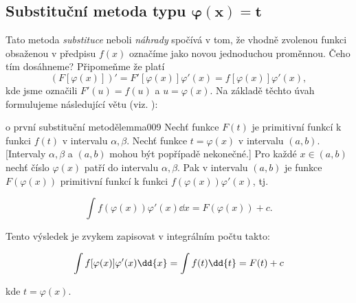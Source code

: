     \newpage
    \subsection[Substituční metoda typu \texorpdfstring{\(\varphi(x) = t\)}{\phi(x) = t}]
      {Substituční metoda typu \(\bm{\varphi(x) = t}\)}\label{mai:IchapVIIsecIIIssecIII} 
      
      Tato metoda \emph{substituce} neboli \emph{náhrady} spočívá v tom, že vhodně zvolenou funkci
      obsaženou v předpisu \(f(x)\) označíme jako novou jednoduchou proměnnou. Čeho tím dosáhneme?
      Připomeňme že platí\[\left(F[\varphi(x)]\right)'=F'[\varphi(x)]\varphi'(x) =
      f[\varphi(x)]\varphi'(x),\] kde jsme označili \(F'(u) = f(u)\) a \(u=\varphi(x)\). Na základě
      těchto úvah formulujeme následující větu (viz. \cite[p.~142]{diblik2002}):

      \begin{mathlemma}{o první substituční metodě}{lemma009}          
        Nechť funkce \(F(t)\) je primitivní funkcí k funkci \(f(t)\) v intervalu \(\alpha, \beta\).
        Nechť funkce \(t = \varphi(x)\) v intervalu \((a,b)\). [Intervaly \(\alpha, \beta\) a
        \((a,b)\) mohou být popřípadě nekonečné.] Pro každé \(x\in(a,b)\) nechť číslo \(\varphi(x)\)
        patří do intervalu \(\alpha, \beta\). Pak v intervalu \((a,b)\) je funkce \(F(\varphi(x))\)
        primitivní funkcí k funkci \(f(\varphi(x))\varphi'(x)\), tj. 
        \begin{fleqn}[0pt]
          \begin{equation}\label{mai:eq176}
            \int{f(\varphi(x))\varphi'(x)\dd{x}} = F(\varphi(x)) + c.
          \end{equation}
        \end{fleqn}
        Tento výsledek je zvykem zapisovat v integrálním počtu takto:
        \begin{fleqn}[0pt]
          \begin{equation}\label{mai:eq177}
            \int{f[\varphi(x)]\varphi'(x)\dd{x}}= \int f(t)\dd{t}= F(t)+c
            \raisetag{14pt}
          \end{equation}
        \end{fleqn}
        kde \(t=\varphi(x)\).
      \end{mathlemma}
  
